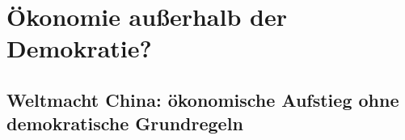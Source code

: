 %
%
%

\chapter{Ökonomie außerhalb der Demokratie?}
\label{Demokratie}

\section{Weltmacht China: ökonomische Aufstieg ohne demokratische Grundregeln}




